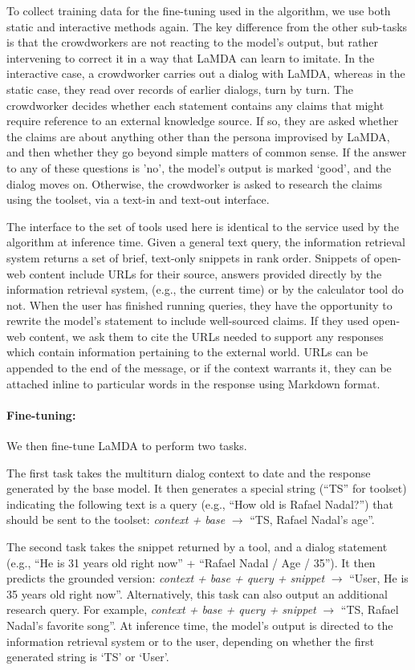 To collect training data for the fine-tuning used in the algorithm, we use both static and interactive methods again. The key difference from the other sub-tasks is that the crowdworkers are not reacting to the model’s output, but rather intervening to correct it in a way that LaMDA can learn to imitate. In the interactive case, a crowdworker carries out a dialog with LaMDA, whereas in the static case, they read over records of earlier dialogs, turn by turn. The crowdworker decides whether each statement contains any claims that might require reference to an external knowledge source. If so, they are asked whether the claims are about anything other than the persona improvised by LaMDA, and then whether they go beyond simple matters of common sense. If the answer to any of these questions is ’no’, the model’s output is marked ‘good’, and the dialog moves on. Otherwise, the crowdworker is asked to research the claims using the toolset, via a text-in and text-out interface.

The interface to the set of tools used here is identical to the service used by the algorithm at inference time. Given a general text query, the information retrieval system returns a set of brief, text-only snippets in rank order. Snippets of open-web content include URLs for their source, answers provided directly by the information retrieval system, (e.g., the current time) or by the calculator tool do not. When the user has finished running queries, they have the opportunity to rewrite the model's statement to include well-sourced claims. If they used open-web content, we ask them to cite the URLs  needed to support any responses which contain information pertaining to the external world. URLs can be appended to the end of the message, or if the context warrants it, they can be attached inline to particular words in the response using Markdown format.

\paragraph{Fine-tuning:}We then fine-tune LaMDA to perform two tasks.

The first task takes the multiturn dialog context to date and the response generated by the base model. It then generates a special string (``TS'' for toolset) indicating the following text is a query (e.g., ``How old is Rafael Nadal?'') that should be sent to the toolset: \emph{context + base} $\rightarrow$ ``TS, Rafael Nadal's age''.

The second task takes the snippet returned by a tool, and a dialog statement (e.g., ``He is 31 years old right now'' + ``Rafael Nadal / Age / 35''). It then predicts the grounded version: \emph{context + base + query + snippet} $\rightarrow$ ``User, He is 35 years old right now''. Alternatively, this task can also output an additional research query. For example, \emph{context + base + query + snippet} $\rightarrow$ ``TS, Rafael Nadal's favorite song''. At inference time, the model's output is directed to the information retrieval system or to the user, depending on whether the first generated string is `TS' or `User'.

